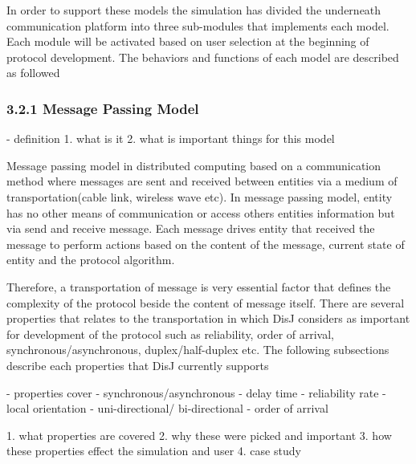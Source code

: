 In order to support these models the simulation has divided the underneath communication platform into three sub-modules that implements each model. Each module will be activated based on user selection at the beginning of protocol development. The behaviors and functions of each model are described as followed

\subsubsection{3.2.1 Message Passing Model}

- definition
1. what is it
2. what is important things for this model

Message passing model in distributed computing based on a communication method where messages are sent and received between entities via a medium of transportation(cable link, wireless wave etc). In message passing model, entity has no other means of communication or access others entities information but via send and receive message. Each message drives entity that received the message to perform actions based on the content of the message, current state of entity and the protocol algorithm.

Therefore, a transportation of message is very essential factor that defines the complexity of the protocol beside the content of message itself. There are several properties that relates to the transportation in which DisJ considers as important for development of the protocol such as reliability, order of arrival, synchronous/asynchronous, duplex/half-duplex etc. The following subsections describe each properties that DisJ currently supports

- properties cover
	- synchronous/asynchronous
	- delay time
	- reliability rate	
	- local orientation
	- uni-directional/ bi-directional
	- order of arrival

1. what properties are covered
2. why these were picked and important
3. how these properties effect the simulation and user
4. case study

